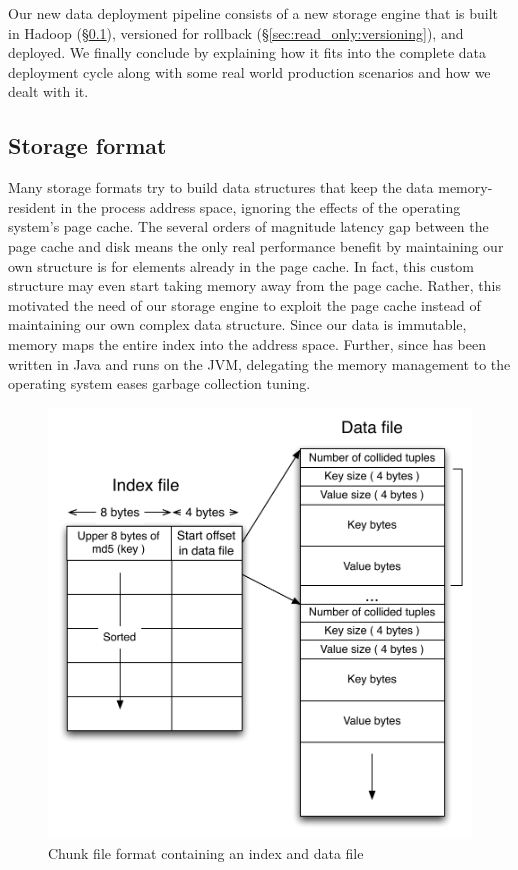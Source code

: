 Our new data deployment pipeline consists of a new storage engine that
is built in Hadoop (\S\ref{sec:read_only:storage_format}), versioned
for rollback (\S\ref{sec:read_only:versioning}), and deployed. We
finally conclude by explaining how it fits into the complete data
deployment cycle along with some real world production scenarios and
how we dealt with it. 


\subsection{Storage format}
\label{sec:read_only:storage_format}

Many storage formats try to build data structures that keep the data
memory-resident in the process address space, ignoring the effects of
the operating system's page cache. The several orders of magnitude 
latency gap between the page cache and disk means the only real 
performance benefit by maintaining our own structure is for elements 
already in the page cache. In fact, this custom structure may even 
start taking memory away from the page cache. Rather, this motivated 
the need of our storage engine to exploit the page cache instead of 
maintaining our own complex data structure. Since our data is immutable, 
\projectname{} memory maps the entire index into the address space. 
Further, since \projectname{} has been written in Java and runs on 
the JVM, delegating the memory management to the operating system 
eases garbage collection tuning.

\begin{figure}
  \centering
    \includegraphics[scale=0.45]{images/storage_format.pdf}
  \caption{Chunk file format containing an index and data file}
  \label{storage_format}
\end{figure}

